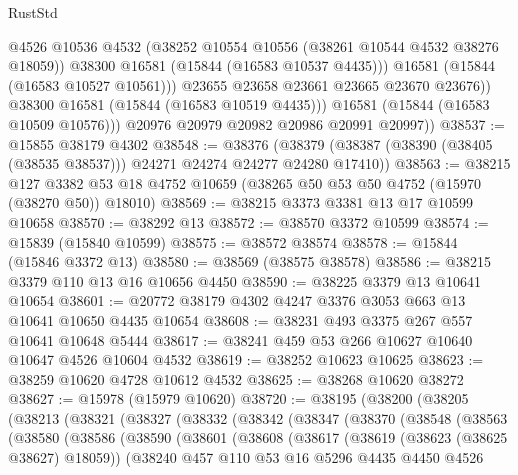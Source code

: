 \begin{lexlean}{RustStd}
\begin{coremodule}
                    @4526
                    @10536
                    @4532
                    (@38252 @10554 @10556 (@38261 @10544 @4532 @38276 @18059))
                    @38300
                    @16581
                    (@15844 (@16583 @10537 @4435)))
                  @16581
                  (@15844 (@16583 @10527 @10561)))
                @23655
                @23658
                @23661
                @23665
                @23670
                @23676))
            @38300
            @16581
            (@15844 (@16583 @10519 @4435)))
          @16581
          (@15844 (@16583 @10509 @10576)))
        @20976
        @20979
        @20982
        @20986
        @20991
        @20997))
@38537 := @15855 @38179 @4302
@38548 := @38376
    (@38379 (@38387 (@38390 (@38405 (@38535 @38537))) @24271 @24274 @24277 @24280 @17410))
@38563 := @38215
    @127
    @3382
    @53
    @18
    @4752
    @10659
    (@38265 @50 @53 @50 @4752 (@15970 (@38270 @50)) @18010)
@38569 := @38215 @3373 @3381 @13 @17 @10599 @10658
@38570 := @38292 @13
@38572 := @38570 @3372 @10599
@38574 := @15839 (@15840 @10599)
@38575 := @38572 @38574
@38578 := @15844 (@15846 @3372 @13)
@38580 := @38569 (@38575 @38578)
@38586 := @38215 @3379 @110 @13 @16 @10656 @4450
@38590 := @38225 @3379 @13 @10641 @10654
@38601 := @20772 @38179 @4302 @4247 @3376 @3053 @663 @13 @10641 @10650 @4435 @10654
@38608 := @38231 @493 @3375 @267 @557 @10641 @10648 @5444
@38617 := @38241 @459 @53 @266 @10627 @10640 @10647 @4526 @10604 @4532
@38619 := @38252 @10623 @10625
@38623 := @38259 @10620 @4728 @10612 @4532
@38625 := @38268 @10620 @38272
@38627 := @15978 (@15979 @10620)
@38720 := @38195
    (@38200
      (@38205
        (@38213
          (@38321
            (@38327
              (@38332
                (@38342
                  (@38347
                    (@38370
                      (@38548
                        (@38563
                          (@38580
                            (@38586
                              (@38590
                                (@38601
                                  (@38608
                                    (@38617
                                      (@38619 (@38623 (@38625 @38627) @18059))
                                      (@38240
                                        @457
                                        @110
                                        @53
                                        @16
                                        @5296
                                        @4435
                                        @4450
                                        @4526

\end{coremodule}
\end{lexlean}
